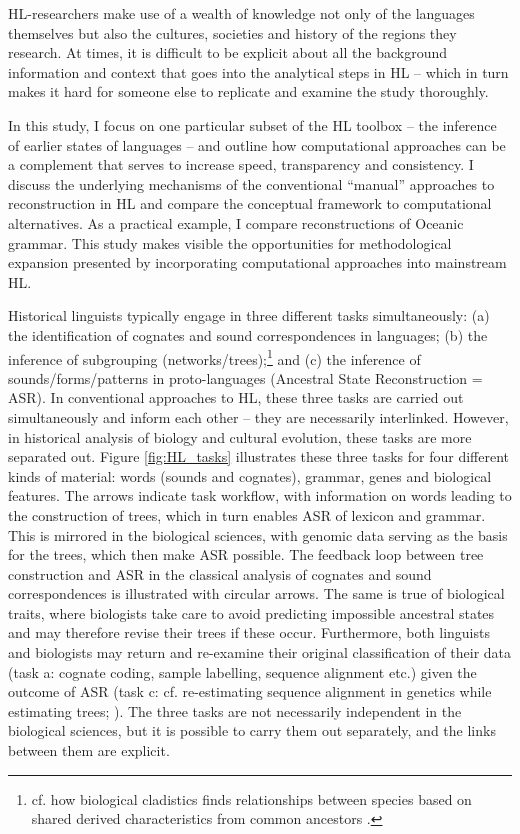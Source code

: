 \documentclass[12pt,letterpaper]{article}
\begin{document}
HL-researchers make use of a wealth of knowledge not only of the languages themselves but also the cultures, societies and history of the regions they research. At times, it is difficult to be explicit about all the background information and context that goes into the analytical steps in HL -- which in turn makes it hard for someone else to replicate and examine the study thoroughly.

In this study, I focus on one particular subset of the HL toolbox -- the inference of earlier states of languages -- and outline how computational approaches can be a complement that serves to increase speed, transparency and consistency. I discuss the underlying mechanisms of the conventional ``manual'' approaches to reconstruction in HL and compare the conceptual framework to computational alternatives. As a practical example, I compare reconstructions of Oceanic grammar. This study makes visible the opportunities for methodological expansion presented by incorporating computational approaches into mainstream HL.

Historical linguists typically engage in three different tasks simultaneously: (a) the identification of cognates and sound correspondences in languages; (b) the inference of subgrouping (networks/trees);\footnote{cf. how biological cladistics finds relationships between species based on shared derived characteristics from common ancestors \citep[16--17]{maclaurin2008biodiversity}.} and (c) the inference of sounds/forms/patterns in proto-languages (Ancestral State Reconstruction = ASR). In conventional approaches to HL, these three tasks are carried out simultaneously and inform each other -- they are necessarily interlinked. However, in historical analysis of biology and cultural evolution, these tasks are more separated out. Figure \ref{fig:HL_tasks} illustrates these three tasks for four different kinds of material: words (sounds and cognates), grammar, genes and biological features. The arrows indicate task workflow, with information on words leading to the construction of trees, which in turn enables ASR of lexicon and grammar. This is mirrored in the biological sciences, with genomic data serving as the basis for the trees, which then make ASR possible. The feedback loop between tree construction and ASR in the classical analysis of cognates and sound correspondences is illustrated with circular arrows. The same is true of biological traits, where biologists take care to avoid predicting impossible ancestral states \citep{schulmeister2004comparative} and may therefore revise their trees if these occur. Furthermore, both linguists and biologists may return and re-examine their original classification of their data (task a: cognate coding, sample labelling, sequence alignment etc.) given the outcome of ASR (task c: cf. re-estimating sequence alignment in genetics while estimating trees; \citealt{Redelings_2021_BAli-Phy}). The three tasks are not necessarily independent in the biological sciences, but it is possible to carry them out separately, and the links between them are explicit. 
\end{document}
